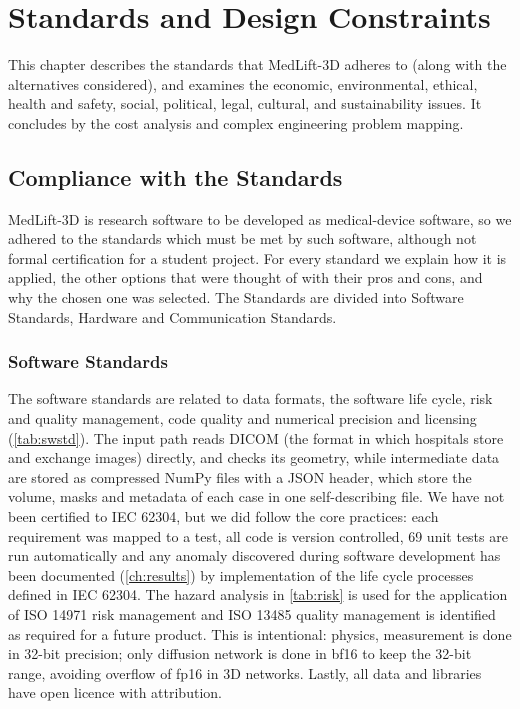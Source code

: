 \chapter{Standards and Design Constraints}
\label{ch:standards}

This chapter describes the standards that MedLift-3D adheres to (along with the alternatives considered), and examines the economic, environmental, ethical, health and safety, social, political, legal, cultural, and sustainability issues. It concludes by the cost analysis and complex engineering problem mapping.

\section{Compliance with the Standards}

MedLift-3D is research software to be developed as medical-device software, so we adhered to the standards which must be met by such software, although not formal certification for a student project. For every standard we explain how it is applied, the other options that were thought of with their pros and cons, and why the chosen one was selected. The Standards are divided into Software Standards, Hardware and Communication Standards.

\subsection{Software Standards}

The software standards are related to data formats, the software life cycle, risk and quality management, code quality and numerical precision and licensing (\cref{tab:swstd}). The input path reads DICOM (the format in which hospitals store and exchange images) directly, and checks its geometry, while intermediate data are stored as compressed NumPy files with a JSON header, which store the volume, masks and metadata of each case in one self-describing file. We have not been certified to IEC 62304, but we did follow the core practices: each requirement was mapped to a test, all code is version controlled, 69 unit tests are run automatically and any anomaly discovered during software development has been documented (\cref{ch:results}) by implementation of the life cycle processes defined in IEC 62304. The hazard analysis in \cref{tab:risk} is used for the application of ISO 14971 risk management and ISO 13485 quality management is identified as required for a future product. This is intentional: physics, measurement is done in 32-bit precision; only diffusion network is done in bf16 to keep the 32-bit range, avoiding overflow of fp16 in 3D networks. Lastly, all data and libraries have open licence with attribution.

